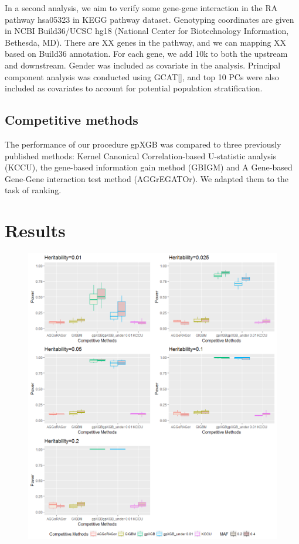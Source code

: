 \documentclass[11pt]{article}
\theoremstyle{plain}
\theoremstyle{definition}
\theoremstyle{remark}
\begin{document}
In a second analysis, we aim to verify some gene-gene interaction in the RA pathway hsa05323 in KEGG pathway dataset. Genotyping coordinates are given in NCBI Build36/UCSC hg18 (National Center for Biotechnology Information, Bethesda, MD). There are XX genes in the pathway, and we can mapping XX based on Build36 annotation. For each gene, we add 10k to both the upstream and downstream. Gender was included as covariate in the analysis. Principal component analysis was conducted using GCAT[], and top 10 PCs were also included as covariates to account for potential population stratification.\\

\subsection{Competitive methods}
The performance of our procedure gpXGB was compared to three previously published methods: Kernel Canonical Correlation-based U-statistic analysis (KCCU)\cite{4, 5}, the gene-based information gain method (GBIGM)\cite{6} and A Gene-based Gene-Gene interaction test method (AGGrEGATOr)\cite{7}. We adapted them to the task of ranking.

\section{Results}

\begin{figure}[H]
    \begin{center}
       \includegraphics[scale=0.7]{Rplot02.png}
    \end{center}
\end{figure}
\end{document}
